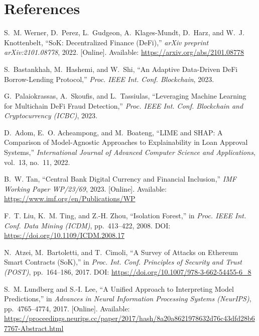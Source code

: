 \documentclass[12pt,a4paper]{report}
\begin{document}
\chapter*{References}

{\small
\begin{enumerate}[label={[\arabic*]}]
\item S.~M. Werner, D.~Perez, L.~Gudgeon, A.~Klages-Mundt, D.~Harz, and W.~J. Knottenbelt, ``SoK: Decentralized Finance (DeFi),'' \textit{arXiv preprint arXiv:2101.08778}, 2022. [Online]. Available: \url{https://arxiv.org/abs/2101.08778}

\item S.~Bastankhah, M.~Hashemi, and W.~Shi, ``An Adaptive Data-Driven DeFi Borrow-Lending Protocol,'' \textit{Proc. IEEE Int. Conf. Blockchain}, 2023.

\item G.~Palaiokrassas, A.~Skoufis, and L.~Tassiulas, ``Leveraging Machine Learning for Multichain DeFi Fraud Detection,'' \textit{Proc. IEEE Int. Conf. Blockchain and Cryptocurrency (ICBC)}, 2023.

\item D.~Adom, E.~O. Acheampong, and M.~Boateng, ``LIME and SHAP: A Comparison of Model-Agnostic Approaches to Explainability in Loan Approval Systems,'' \textit{International Journal of Advanced Computer Science and Applications}, vol.~13, no.~11, 2022.

\item B.~W. Tan, ``Central Bank Digital Currency and Financial Inclusion,'' \textit{IMF Working Paper WP/23/69}, 2023. [Online]. Available: \url{https://www.imf.org/en/Publications/WP}

\item F.~T. Liu, K.~M. Ting, and Z.-H. Zhou, ``Isolation Forest,'' in \textit{Proc. IEEE Int. Conf. Data Mining (ICDM)}, pp.~413--422, 2008. DOI: \url{https://doi.org/10.1109/ICDM.2008.17}

\item N.~Atzei, M.~Bartoletti, and T.~Cimoli, ``A Survey of Attacks on Ethereum Smart Contracts (SoK),'' in \textit{Proc. Int. Conf. Principles of Security and Trust (POST)}, pp.~164--186, 2017. DOI: \url{https://doi.org/10.1007/978-3-662-54455-6_8}

\item S.~M. Lundberg and S.-I. Lee, ``A Unified Approach to Interpreting Model Predictions,'' in \textit{Advances in Neural Information Processing Systems (NeurIPS)}, pp.~4765--4774, 2017. [Online]. Available: \url{https://proceedings.neurips.cc/paper/2017/hash/8a20a8621978632d76c43dfd28b67767-Abstract.html}


\end{enumerate}}
\end{document}
